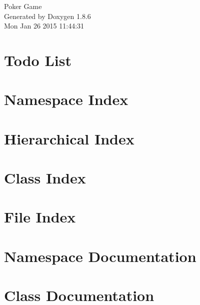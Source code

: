 \documentclass[twoside]{book}
\newcommand{\clearemptydoublepage}{%
  \newpage{\pagestyle{empty}\cleardoublepage}%
}
\begin{document}
\hypersetup{pageanchor=false}
\begin{titlepage}
\vspace*{7cm}
\begin{center}%
{\Large Poker Game }\\
\vspace*{1cm}
{\large Generated by Doxygen 1.8.6}\\
\vspace*{0.5cm}
{\small Mon Jan 26 2015 11:44:31}\\
\end{center}
\end{titlepage}
\clearemptydoublepage
\tableofcontents
\clearemptydoublepage
{}
\hypersetup{pageanchor=true}

\chapter{Todo List}
\label{todo}
\hypertarget{todo}{}

\chapter{Namespace Index}

\chapter{Hierarchical Index}

\chapter{Class Index}

\chapter{File Index}

\chapter{Namespace Documentation}









\chapter{Class Documentation}




















\end{document}
